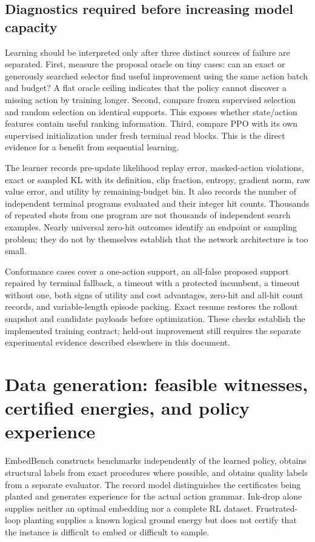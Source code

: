\documentclass[11pt,a4paper]{article}
\theoremstyle{definition}\newtheorem{definition}[proposition]{Definition}
\begin{document}
\subsection{Diagnostics required before increasing model capacity}

Learning should be interpreted only after three distinct sources of failure are separated. First,
measure the proposal oracle on tiny cases: can an exact or generously searched selector find useful
improvement using the same action batch and budget? A flat oracle ceiling indicates that the policy
cannot discover a missing action by training longer. Second, compare frozen supervised selection and
random selection on identical supports. This exposes whether state/action features contain useful
ranking information. Third, compare PPO with its own supervised initialization under fresh terminal
read blocks. This is the direct evidence for a benefit from sequential learning.

The learner records pre-update likelihood replay error, masked-action violations, exact or sampled
KL with its definition, clip fraction, entropy, gradient norm, raw value error, and utility by
remaining-budget bin. It also records the number of independent terminal programs evaluated and
their integer hit counts. Thousands of repeated shots from one program are not thousands of
independent search examples. Nearly universal zero-hit outcomes identify an endpoint or sampling
problem; they do not by themselves establish that the network architecture is too small.

Conformance cases cover a one-action support, an all-false proposed support repaired by terminal
fallback, a timeout with a protected incumbent, a timeout without one, both signs of utility and
cost advantages, zero-hit and all-hit count records, and variable-length episode packing. Exact
resume restores the rollout snapshot and candidate payloads before optimization. These checks
establish the implemented training contract; held-out improvement still requires the separate
experimental evidence described elsewhere in this document.
 \section{Data generation: feasible witnesses, certified energies, and policy experience}
\label{data:overview}

EmbedBench constructs benchmarks independently of the learned policy, obtains structural labels from exact procedures where possible, and obtains quality labels from a separate evaluator. The record model distinguishes the certificates being planted and generates experience for the actual action grammar. Ink-drop alone supplies neither an optimal embedding nor a complete RL dataset. Frustrated-loop planting supplies a known logical ground energy but does not certify that the instance is difficult to embed or difficult to sample.
\end{document}
